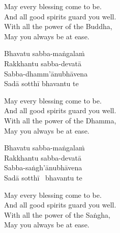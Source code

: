 \begin{english-verses}
  May every blessing come to be.\\
  And all good spirits guard you well.\\
  With all the power of the Buddha,\\
  May you always be at ease.
\end{english-verses}

\begin{pali-hang-continued}
  Bhavatu sabba-maṅgalaṁ\\
  Rakkhantu sabba-devatā\\
  Sabba-dhamm'ānubhāvena\\
  Sadā sotthī bhavantu te
\end{pali-hang-continued}

\begin{english-verses}
  May every blessing come to be.\\
  And all good spirits guard you well.\\
  With all the power of the Dhamma,\\
  May you always be at ease.
\end{english-verses}
  
\ifninebythirteen\clearpage\fi

\begin{pali-hang-continued}
  Bhavatu sabba-maṅgalaṁ\\
  Rakkhantu sabba-devatā\\
  Sabba-saṅgh'ānubhāvena\\
  Sadā sotthī \breathmark\ bhavantu te
\end{pali-hang-continued}

\ifafive\clearpage\fi

\begin{english-verses}
  May every blessing come to be.\\
  And all good spirits guard you well.\\
  With all the power of the Saṅgha,\\
  \ifbfive\enlargethispage{2\baselineskip}\fi
  May you always be at ease.
\end{english-verses}

\ifbfive\vspace{-0.25cm}\fi

\suttaRef{[MJG]}

\ifdigital{}\fi

\endgroup

